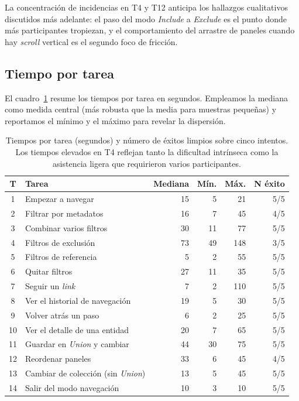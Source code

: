 La concentración de incidencias en T4 y T12 anticipa los hallazgos cualitativos discutidos
más adelante: el paso del modo \textit{Include} a \textit{Exclude} es el punto donde más
participantes tropiezan, y el comportamiento del arrastre de paneles cuando hay
\textit{scroll} vertical es el segundo foco de fricción.

\subsection{Tiempo por tarea}

El cuadro~\ref{tab:tiemposTareas} resume los tiempos por tarea en segundos. Empleamos la
mediana como medida central (más robusta que la media para muestras pequeñas) y reportamos
el mínimo y el máximo para revelar la dispersión.

\begin{table}[H]
\centering
\small
\begin{tabular}{c l r r r r}
\hline
\textbf{T} & \textbf{Tarea}                       & \textbf{Mediana} & \textbf{Mín.} & \textbf{Máx.} & \textbf{N éxito} \\
\hline
1  & Empezar a navegar                            & 15  & 5   & 21  & 5/5 \\
2  & Filtrar por metadatos                        & 16  & 7   & 45  & 4/5 \\
3  & Combinar varios filtros                      & 30  & 11  & 77  & 5/5 \\
4  & Filtros de exclusión                         & 73  & 49  & 148 & 3/5 \\
5  & Filtros de referencia                        & 5   & 2   & 55  & 5/5 \\
6  & Quitar filtros                               & 27  & 11  & 35  & 5/5 \\
7  & Seguir un \textit{link}                      & 7   & 2   & 110 & 5/5 \\
8  & Ver el historial de navegación               & 19  & 5   & 30  & 5/5 \\
9  & Volver atrás un paso                         & 6   & 2   & 25  & 5/5 \\
10 & Ver el detalle de una entidad                & 20  & 7   & 65  & 5/5 \\
11 & Guardar en \textit{Union} y cambiar          & 44  & 30  & 75  & 5/5 \\
12 & Reordenar paneles                            & 33  & 6   & 45  & 4/5 \\
13 & Cambiar de colección (sin \textit{Union})    & 13  & 5   & 45  & 5/5 \\
14 & Salir del modo navegación                    & 10  & 3   & 10  & 5/5 \\
\hline
\end{tabular}
\caption[Tiempos y éxitos por tarea]{Tiempos por tarea (segundos) y número de éxitos limpios sobre cinco intentos. Los
tiempos elevados en T4 reflejan tanto la dificultad intrínseca como la asistencia ligera
que requirieron varios participantes.}
\label{tab:tiemposTareas}
\end{table}

